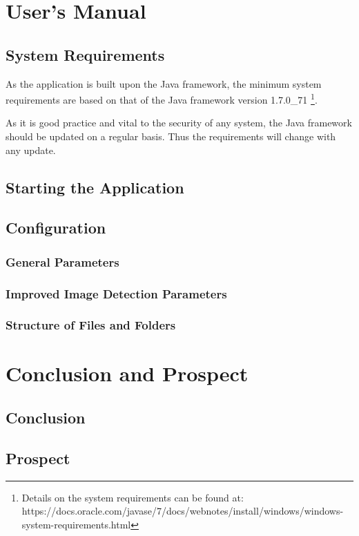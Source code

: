 \documentclass[a4paper, 11pt]{article}
\begin{document}
\section{User's Manual}

\subsection{System Requirements}
As the application is built upon the Java framework, the minimum system
requirements are based on that of the Java framework version 1.7.0\_71
\footnote{Details on the system requirements can be found at:
https://docs.oracle.com/javase/7/docs/webnotes/install/windows/windows-system-requirements.html}.

As it is good practice and vital to the security of any system, the Java
framework should be updated on a regular basis. Thus the requirements will
change with any update.
\subsection{Starting the Application}

\subsection{Configuration}
\subsubsection{General Parameters}
\subsubsection{Improved Image Detection Parameters}
\subsubsection{Structure of Files and Folders}

\newpage
\section{Conclusion and Prospect}
 
\subsection{Conclusion}

\subsection{Prospect}


\newpage
{}

\end{document}
